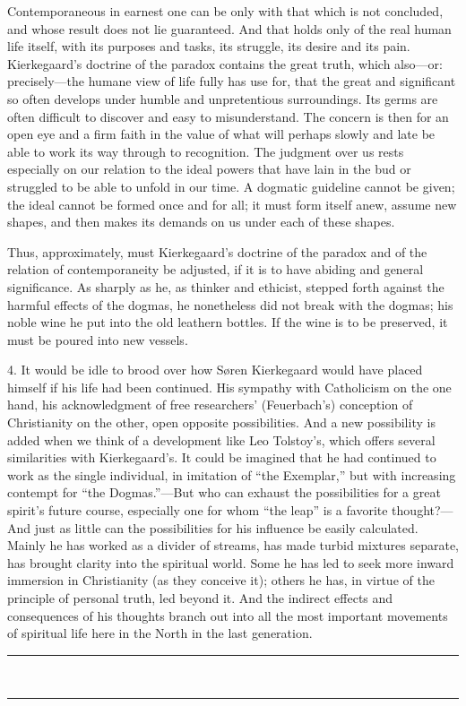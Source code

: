 \documentclass[12pt,a4paper]{book}
\newcommand{\opage}[1]{\marginnote{\footnotesize\textit{[#1]}}}
\begin{document}
Contemporaneous in earnest one can be only with that which is not
concluded, and whose result does not lie guaranteed. And that holds only
of the real human life itself, with its purposes and tasks, its struggle,
its desire and its pain. Kierkegaard's doctrine of the paradox contains
the great truth, which also---or: precisely---the humane view of life
fully has use for, that the great and significant so often develops under
humble and unpretentious surroundings. Its germs are often difficult to
discover and easy to misunderstand. The concern is then for an open eye
and a firm faith in the value of what will perhaps slowly and late be
able to work its way through to recognition. The judgment over us rests
especially on our relation to the ideal powers that have lain in the bud
or struggled to be able to unfold in our time. A dogmatic guideline
cannot be given; the ideal cannot be formed once and for all; it must
form itself anew, assume new shapes, and then makes its demands on us
under each of these shapes.

Thus, approximately, must Kierkegaard's doctrine of the paradox and of
the relation of contemporaneity be adjusted, if it is to have abiding and
general significance. As sharply as he, as thinker and ethicist, stepped
forth against the harmful effects of the dogmas, he nonetheless did not
break with the dogmas; his noble wine he put into the old leathern
bottles. If the wine is to be preserved, it must be poured into new
vessels.

4. It would be idle to brood over how Søren Kierkegaard would have placed
himself if his life had been continued. His sympathy with Catholicism on
the one hand, his acknowledgment of free researchers' (Feuerbach's)
conception of Christianity on the
\opage{159}other, open opposite possibilities. And a new possibility is
added when we think of a development like Leo Tolstoy's, which offers
several similarities with Kierkegaard's. It could be imagined that he had
continued to work as the single individual, in imitation of ``the
Exemplar,'' but with increasing contempt for ``the Dogmas.''---But who can
exhaust the possibilities for a great spirit's future course, especially
one for whom ``the leap'' is a favorite thought?---And just as little can
the possibilities for his influence be easily calculated. Mainly he has
worked as a divider of streams, has made turbid mixtures separate, has
brought clarity into the spiritual world. Some he has led to seek more
inward immersion in Christianity (as they conceive it); others he has, in
virtue of the principle of personal truth, led beyond it. And the
indirect effects and consequences of his thoughts branch out into all the
most important movements of spiritual life here in the North
in the last generation.
\begin{center}\rule{2cm}{0.4pt}\\[-8pt]\rule{2cm}{0.4pt}\end{center}
\end{document}
